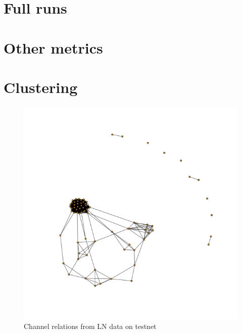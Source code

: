 \section{Full runs}

\section{Other metrics}

\section{Clustering}

\begin{figure}[h]
    \centering
    \includegraphics[width=12cm]{figures/channelGraphLNTS.png}
    \caption{Channel relations from LN data on testnet}
    \label{fig:channelGraphLNTS}
\end{figure}